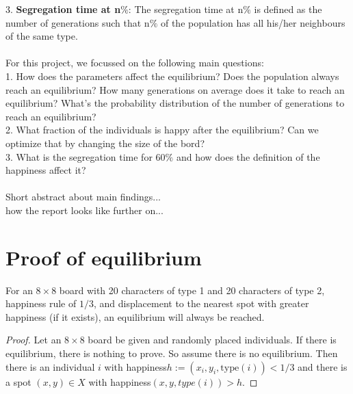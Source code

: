 \documentclass{article}
\begin{document}
3. \textbf{Segregation time at n$\%$}: The segregation time at n$\%$ is defined as the number of generations such that n$\%$ of the population has all his/her neighbours of the same type.
\\
\\
For this project, we focussed on the following main questions:\\
1. How does the parameters affect the equilibrium? Does the population always reach an equilibrium? How many generations on average does it take to reach an equilibrium? What's the probability distribution of the number of generations to reach an equilibrium?\\
2. What fraction of the individuals is happy after the equilibrium? Can we optimize that by changing the size of the bord?\\
3. What is the segregation time for 60$\%$ and how does the definition of the happiness affect it?\\
\\
Short abstract about main findings...\\
how the report looks like further on...
\section{Proof of equilibrium}

For an $8\times 8$ board with 20 characters of type 1 and 20 characters of type 2, happiness rule of $1/3$, and displacement to the nearest spot with greater happiness (if it exists), an equilibrium will always be reached.
\begin{proof}
Let an $8\times 8$ board be given and randomly placed individuals. If there is equilibrium, there is nothing to prove. So assume there is no equilibrium. Then there is an individual $i$ with happiness$h := (x_i,y_i,\text{type}(i)) < 1/3$ and there is a spot $(x,y)\in X$ with happiness$(x,y,type(i)) > h$.
\end{proof} 
\end{document}

